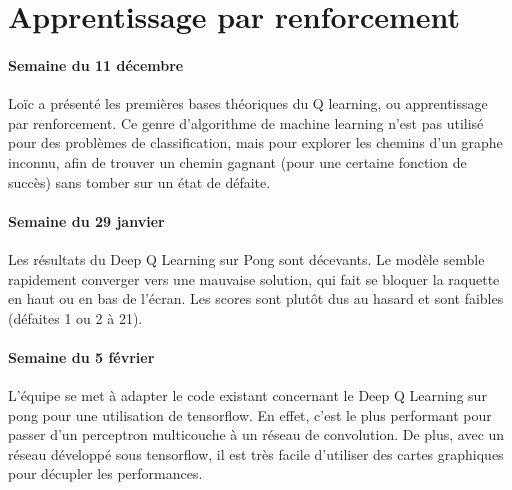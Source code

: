 \documentclass[
    10pt,
    a4paper,
    oneside,
    headinclude,footinclude,
    BCOR=5mm,
]{scrartcl}
\begin{document}
\section{Apprentissage par renforcement}

\paragraph{Semaine du 11 décembre}

Loïc a présenté les premières bases théoriques du Q learning, ou apprentissage par renforcement. Ce genre d'algorithme de machine learning n'est pas utilisé pour des problèmes de classification, mais pour explorer les chemins d'un graphe inconnu, afin de trouver un chemin gagnant (pour une certaine fonction de succès) sans tomber sur un état de défaite.

\paragraph{Semaine du 29 janvier}

Les résultats du Deep Q Learning sur Pong sont décevants. Le modèle semble rapidement converger vers une mauvaise solution, qui fait se bloquer la raquette en haut ou en bas de l'écran. Les scores sont plutôt dus au hasard et sont faibles (défaites 1 ou 2 à 21).

\paragraph{Semaine du 5 février}

L'équipe se met à adapter le code existant concernant le Deep Q Learning sur pong pour une utilisation de tensorflow. En effet, c'est le plus performant pour passer d'un perceptron multicouche à un réseau de convolution. De plus, avec un réseau développé sous tensorflow, il est très facile d'utiliser des cartes graphiques pour décupler les performances.

\renewcommand{\refname}{\spacedlowsmallcaps{References}} %

\end{document}

